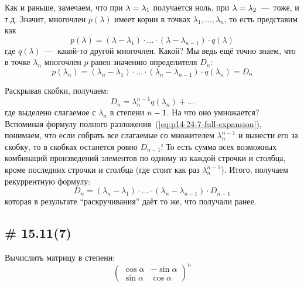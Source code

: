 \documentclass[a4paper,12pt]{article}
\theoremstyle{remark}
\begin{document}
\begin{solution}
    Как и раньше, замечаем, что при $\lambda \hm= \lambda_1$ получается ноль, при $\lambda \hm= \lambda_2$~---~тоже, и т.д.
    Значит, многочлен $p(\lambda)$ имеет корни в точках $\lambda_1, \ldots, \lambda_n$, то есть представим как
    \[
      p(\lambda) = (\lambda - \lambda_1) \cdot \ldots \cdot (\lambda - \lambda_{n-1}) \cdot q(\lambda)
    \]
    где $q(\lambda)$~---~какой-то другой многочлен.
    Какой?
    Мы ведь ещё точно знаем, что в точке $\lambda_n$ многочлен $p$ равен значению определителя $D_n$:
    \[
      p(\lambda_n) = (\lambda_n - \lambda_1) \cdot \ldots \cdot (\lambda_n - \lambda_{n-1}) \cdot q(\lambda_n) = D_n
    \]
    
    Раскрывая скобки, получаем:
    \[
      D_n = \lambda_n^{n-1} q(\lambda_n) + \ldots
    \]
    где выделено слагаемое с $\lambda_n$ в степени $n \hm- 1$.
    На что оно умножается?
    Вспоминая формулу полного разложения~(\ref{eq:p14-24-7-full-expansion}), понимаем, что если собрать все слагаемые со множителем $\lambda_n^{n-1}$ и вынести его за скобку, то в скобках останется ровно $D_{n-1}$!
    То есть сумма всех возможных комбинаций произведений элементов по одному из каждой строчки и столбца, кроме последних строчки и столбца (где стоит как раз $\lambda_n^{n-1}$).
    Итого, получаем рекуррентную формулу:
    \[
      D_n = (\lambda_n - \lambda_1) \cdot \ldots \cdot (\lambda_n - \lambda_{n-1}) \cdot D_{n-1}
    \]
    которая в результате ``раскручивания'' даёт то же, что получали ранее.
  \end{solution}
  
  
  \subsection{\# 15.11(7)}
  
  Вычислить матрицу в степени:
  \[
    \begin{pmatrix}
      \cos \alpha & -\sin \alpha\\
      \sin \alpha & \cos \alpha
    \end{pmatrix}^n
  \]
  
\end{document}
